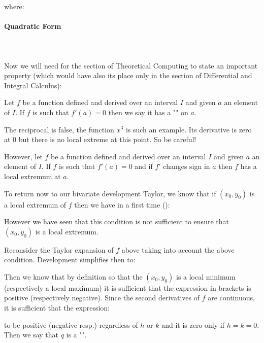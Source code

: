 	where:
	
	
	\pagebreak
	\paragraph{Quadratic Form}\mbox{}\\\\
	Now we will need for the section of Theoretical Computing to state an important property (which would have also its place only in the section of Differential and Integral Calculus):
	
	Let $f$ be a function defined and derived over an interval $I$ and given $a$ an element of $I$. If $f$ is such that $f'(a)=0$ then we say it has a "\label{local extremum}" on $a$.
	
	\begin{tcolorbox}[title=Remark,colframe=black,arc=10pt]
	The reciprocal is false, the function $x^3$ is such an example. Its derivative is zero at $0$ but there is no local extreme at this point. So be careful!
	\end{tcolorbox}
	
	However, let $f$ be a function defined and derived over an interval $I$ and given $a$ an element of $I$. If $f$ is such that $f'(a)=0$ and if $f'$ changes sign in $a$ then $f$ has a local extremum at $a$.
	
	To return now to our bivariate development Taylor, we know that if $(x_0,y_0)$ is a local extremum of $f$ then we have in a first time ():
	
	However we have seen that this condition is not sufficient to ensure that $(x_0,y_0)$ is a local extremum.
	
	Reconsider the Taylor expansion of $f$ above taking into account the above condition. Development simplifies then to:
	
	Then we know that by definition so that the $(x_0,y_0)$ is a local minimum (respectively a local maximum) it is sufficient that the expression in brackets is positive (respectively negative). Since the second derivatives of $f$ are continuous, it is sufficient that the expression:
	
	to be positive (negative resp.) regardless of $h$ or $k$ and it is zero only if $h=k=0$. Then we say that $q$ is a "".
	
